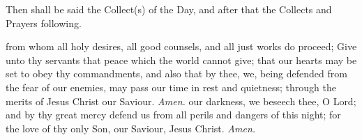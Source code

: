 \begin{rubric}
Then shall be said the Collect(s) of the Day, and after that the Collects and Prayers following.
\end{rubric}
\vspace{-2ex}
 from whom all holy desires, all good counsels, and all just works do proceed; Give unto thy servants that peace which the world cannot give; that our hearts may be set to obey thy commandments, and also that by thee, we, being defended from the fear of our enemies, may pass our time in rest and quietness; through the merits of Jesus Christ our Saviour. \textit{Amen.}
 \vspace{-1ex}
 our darkness, we beseech thee, O Lord; and by thy great mercy defend us from all perils and dangers of this night; for the love of thy only Son, our Saviour, Jesus Christ. \textit{Amen.}

